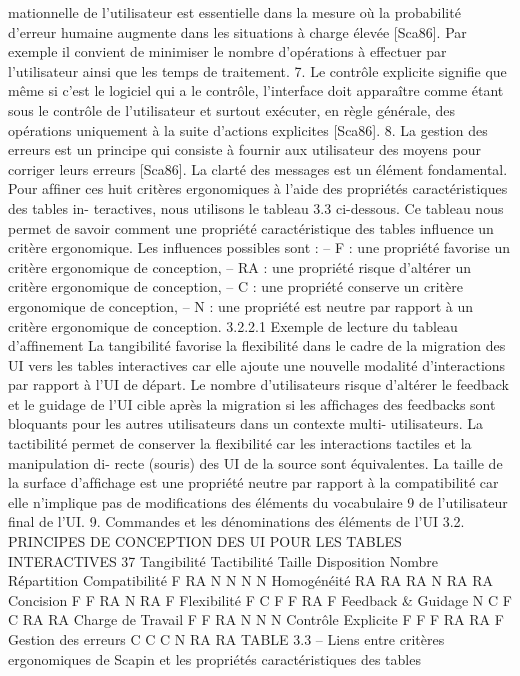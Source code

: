 \documentclass{article}
\begin{document}
mationnelle de l’utilisateur est essentielle dans la mesure où la probabilité d’erreur humaine
augmente dans les situations à charge élevée [Sca86]. Par exemple il convient de minimiser le
nombre d’opérations à effectuer par l’utilisateur ainsi que les temps de traitement.
7. Le contrôle explicite signiﬁe que même si c’est le logiciel qui a le contrôle, l’interface doit
apparaître comme étant sous le contrôle de l’utilisateur et surtout exécuter, en règle générale,
des opérations uniquement à la suite d’actions explicites [Sca86].
8. La gestion des erreurs est un principe qui consiste à fournir aux utilisateur des moyens pour
corriger leurs erreurs [Sca86]. La clarté des messages est un élément fondamental.
Pour afﬁner ces huit critères ergonomiques à l’aide des propriétés caractéristiques des tables in-
teractives, nous utilisons le tableau 3.3 ci-dessous. Ce tableau nous permet de savoir comment une
propriété caractéristique des tables inﬂuence un critère ergonomique. Les inﬂuences possibles sont :
– F : une propriété favorise un critère ergonomique de conception,
– RA : une propriété risque d’altérer un critère ergonomique de conception,
– C : une propriété conserve un critère ergonomique de conception,
– N : une propriété est neutre par rapport à un critère ergonomique de conception.
3.2.2.1
Exemple de lecture du tableau d’afﬁnement
La tangibilité favorise la ﬂexibilité dans le cadre de la migration des UI vers les tables interactives
car elle ajoute une nouvelle modalité d’interactions par rapport à l’UI de départ.
Le nombre d’utilisateurs risque d’altérer le feedback et le guidage de l’UI cible après la migration
si les afﬁchages des feedbacks sont bloquants pour les autres utilisateurs dans un contexte multi-
utilisateurs.
La tactibilité permet de conserver la ﬂexibilité car les interactions tactiles et la manipulation di-
recte (souris) des UI de la source sont équivalentes.
La taille de la surface d’afﬁchage est une propriété neutre par rapport à la compatibilité car elle
n’implique pas de modiﬁcations des éléments du vocabulaire 9 de l’utilisateur ﬁnal de l’UI.
9. Commandes et les dénominations des éléments de l’UI
3.2. PRINCIPES DE CONCEPTION DES UI POUR LES TABLES INTERACTIVES
37
Tangibilité
Tactibilité
Taille
Disposition
Nombre
Répartition
Compatibilité
F
RA
N
N
N
N
Homogénéité
RA
RA
RA
N
RA
RA
Concision
F
F
RA
N
RA
F
Flexibilité
F
C
F
F
RA
F
Feedback
&
Guidage
N
C
F
C
RA
RA
Charge de Travail
F
F
RA
N
N
N
Contrôle Explicite
F
F
F
RA
RA
F
Gestion des erreurs
C
C
C
N
RA
RA
TABLE 3.3 – Liens entre critères ergonomiques de Scapin et les propriétés caractéristiques des tables
\end{document}
